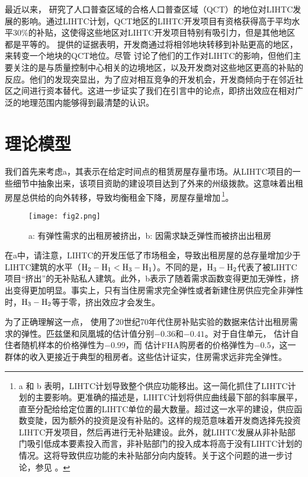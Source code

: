 \documentclass[lang=cn,11pt,a4paper]{paper}
\begin{document}
最近以来，\cite{Baum-Snow2009654} 研究了人口普查区域的合格人口普查区域（QCT）的地位对LIHTC发展的影响。通过LIHTC计划，QCT地区的LIHTC开发项目有资格获得高于平均水平30\%的补贴，这使得这些地区对LIHTC开发项目特别有吸引力，但是其他地区都是平等的。\cite{Baum-Snow2009654} 提供的证据表明，开发商通过将相邻地块转移到补贴更高的地区，来转变一个地块的QCT地位。尽管 \cite{Baum-Snow2009654} 讨论了他们的工作对LIHTC的影响，但他们主要关注的是与质量控制中心相关的边境地区，以及开发商对这些地区更高的补贴的反应。他们的发现突显出，为了应对相互竞争的开发机会，开发商倾向于在邻近社区之间进行资本替代。这进一步证实了我们在引言中的论点，即挤出效应在相对广泛的地理范围内能够得到最清楚的认识。

\section{理论模型}\label{sec3}

我们首先来考虑a，其表示在给定时间点的租赁房屋存量市场。从LIHTC项目的一些细节中抽象出来，该项目资助的建设项目达到了外来的州级拨款。这意味着出租房屋总供给的向外转移，导致均衡租金下降，房屋存量增加\,\footnote{a 和 b 表明，LIHTC计划导致整个供应功能移出。这一简化抓住了LIHTC计划的主要影响。更准确的描述是，LIHTC计划将供应曲线最下部的斜率展平，直至分配给给定位置的LIHTC单位的最大数量。超过这一水平的建设，供应函数变陡，因为额外的投资是没有补贴的。这样的规范意味着开发商选择先投资LIHTC开发项目，然后再进行无补贴建设。此外，就LIHTC发展从非补贴部门吸引低成本要素投入而言，非补贴部门的投入成本将高于没有LIHTC计划的情况。这将导致供应功能的未补贴部分向内旋转。关于这个问题的进一步讨论，参见 \cite{Olsen2007618}。}。

\begin{figure}[h]
	\centering
	\texttt{[image: fig2.png]}
	\caption{a: 有弹性需求的出租房被挤出，b: 因需求缺乏弹性而被挤出出租房}\label{fig2}
\end{figure}

在a中，请注意，LIHTC的开发压低了市场租金，导致出租房屋的总存量增加少于LIHTC建筑的水平（$\rm{H}_2-\rm{H}_1 < \rm{H}_3-\rm{H}_1$）。不同的是，$\rm{H}_3-\rm{H}_2$代表了被LIHTC项目“挤出”的无补贴私人建筑。此外，b表示了随着需求函数变得更加无弹性，挤出变得更加明显。事实上，只有当住房需求完全弹性或者新建住房供应完全非弹性时，$\rm{H}_3-\rm{H}_2$等于零，挤出效应才会发生。

为了正确理解这一点，\cite{Hanushek1980449} 使用了20世纪70年代住房补贴实验的数据来估计出租房需求的弹性。匹兹堡和凤凰城的估计值分别$-0.36$和$-0.41$。对于自住单元，\cite{Rosen19791} 估计自住者随机样本的价格弹性为$-0.99$，而 \cite{Rosen19791} 估计FHA购房者的价格弹性为$-0.5$，这一群体的收入更接近于典型的租房者。这些估计证实，住房需求远非完全弹性。
\end{document}

